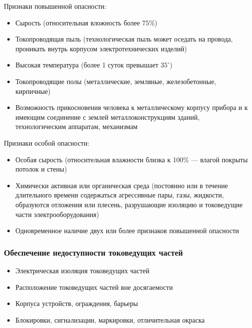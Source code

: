 \documentclass[a4paper, 14pt]{extarticle}
\begin{document}
Признаки повышенной опасности:
\begin{itemize}
    \item Сырость (относительная вложность более 75\%)
    \item Токопроводящая пыль (технологическая пыль может оседать на провода, проникать внутрь корпусом электротехнических изделий)
    \item Высокая температура (более 1 суток превышает $35^\circ$)
    \item Токопроводящие полы (металлические, земляные, железобетонные, кирпичные)
    \item Возможность прикосновения человека к металлическому корпусу прибора и к имеющим соединение с землей металлоконструкциям зданий, технологическим аппаратам, механизмам
\end{itemize}

Признаки особой опасности:
\begin{itemize}
    \item Особая сырость (относительная влажности близка к 100\% --- влагой покрыты потолок и стены)
    \item Химически активная или органическая среда (постоянно или в течение длительного времени содержаться агрессивные пары, газы, жидкости, образуются отложения или плесень, разрушающие изоляцию и токоведущие части электрооборудования)
    \item Одновременное наличие двух или более признаков повышенной опасности
\end{itemize}

\subsubsection{Обеспечение недоступности токоведущих частей}
\begin{itemize}
    \item Электрическая изоляция токоведущих частей
    \item Расположение токоведущих частей вне досягаемости
    \item Корпуса устройств, ограждения, барьеры
    \item Блокировки, сигнализации, маркировки, отличительная окраска
\end{itemize}
\end{document}
